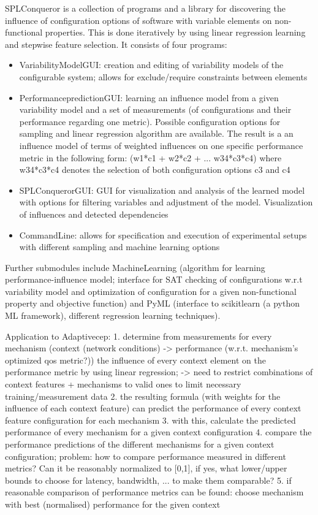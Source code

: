 SPLConqueror is a collection of programs and a library for discovering the influence of configuration options of software with variable elements on non-functional properties. This is done iteratively by using linear regression learning and stepwise feature selection. It consists of four programs: 
\begin{itemize}
\item VariabilityModelGUI: creation and editing of variability models of the configurable system; allows for exclude/require constraints between elements
\item Performan\gls{cep}redictionGUI: learning an influence model from a given variability model and a set of measurements (of configurations and their performance regarding one metric). Possible configuration options for sampling and linear regression algorithm are available. The result is a an influence model of terms of weighted influences on one specific performance metric in the following form: (w1*c1 + w2*c2 + ... w34*c3*c4) where w34*c3*c4 denotes the selection of both configuration options c3 and c4
\item SPLConquerorGUI: GUI for visualization and analysis of the learned model with options for filtering variables and adjustment of the model. Visualization of influences and detected dependencies
\item CommandLine: allows for specification and execution of experimental setups with different sampling and machine learning options
\end{itemize}
 Further submodules include MachineLearning (algorithm for learning performance-influence model; interface for SAT checking of configurations w.r.t variability model and optimization of configuration for a given non-functional property and objective function) and PyML (interface to scikitlearn (a python ML framework), different regression learning techniques).
 
 Application to Adaptive\gls{cep}: 
 1. determine from measurements for every mechanism (context (network conditions) -> performance (w.r.t. mechanism's optimized \gls{qos} metric?)) the influence of every context element on the performance metric by using linear regression; -> need to restrict combinations of context features + mechanisms to valid ones to limit necessary training/measurement data 
 2. the resulting formula (with weights for the influence of each context feature) can predict the performance of every context feature configuration for each mechanism 
 3. with this, calculate the predicted performance of every mechanism for a given context configuration
 4. compare the performance predictions of the different mechanisms for a given context configuration; problem: how to compare performance measured in different metrics? Can it be reasonably normalized to [0,1], if yes, what lower/upper bounds to choose for latency, bandwidth, ... to make them comparable?
 5. if reasonable comparison of performance metrics can be found: choose mechanism with best (normalised) performance for the given context
